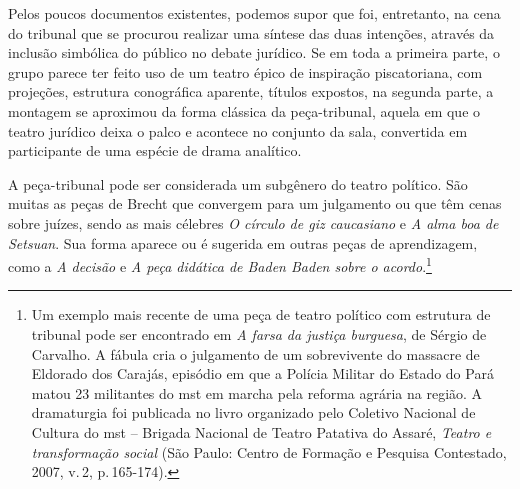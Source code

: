 
Pelos poucos documentos existentes, podemos supor que foi, entretanto,
na cena do tribunal que se procurou realizar uma síntese das duas
intenções, através da inclusão simbólica do público no debate jurídico.
Se em toda a primeira parte, o grupo parece ter feito uso de um teatro
épico de inspiração piscatoriana, com projeções, estrutura conográfica
aparente, títulos expostos, na segunda parte, a montagem se aproximou da
forma clássica da peça-tribunal, aquela em que o teatro jurídico deixa o
palco e acontece no conjunto da sala, convertida em participante de uma
espécie de drama analítico.


A peça-tribunal pode ser considerada um subgênero do teatro político.
São muitas as peças de Brecht que convergem para um julgamento ou que
têm cenas sobre juízes, sendo as mais célebres {\it O círculo de giz
caucasiano} e {\it A alma boa de Setsuan}. Sua forma aparece ou é
sugerida em outras peças de aprendizagem, como a {\it A decisão} e
{\it A peça didática de Baden Baden sobre o acordo}.\footnote{Um exemplo
  mais recente de uma peça de teatro político com estrutura de tribunal
  pode ser encontrado em {\it A farsa da justiça burguesa}, de Sérgio de
  Carvalho. A fábula cria o julgamento de um sobrevivente do massacre de
  Eldorado dos Carajás, episódio em que a Polícia Militar do Estado do
  Pará matou 23 militantes do {\sc mst} em marcha pela reforma agrária na
  região. A dramaturgia foi publicada no livro organizado pelo Coletivo
  Nacional de Cultura do {\sc mst} -- Brigada Nacional de Teatro Patativa do
  Assaré, {\it Teatro e transformação social} (São Paulo: Centro de
  Formação e Pesquisa Contestado, 2007, v.\,2, p.\,165-174).}


